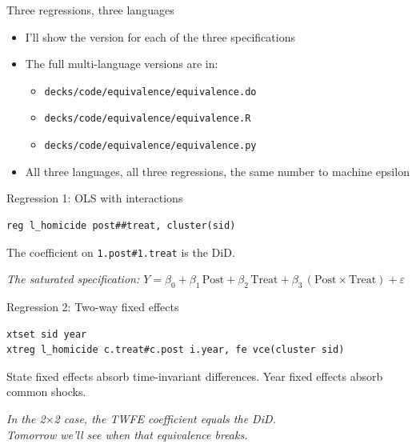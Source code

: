 \documentclass[aspectratio=169,11pt]{beamer}
\begin{document}
\begin{frame}{Three regressions, three languages}
\vspace{0.8em}
\begin{itemize}
  \item I'll show the  version for each of the three specifications
  \item The full multi-language versions are in:
  \begin{itemize}
    \item \texttt{decks/code/equivalence/equivalence.do}
    \item \texttt{decks/code/equivalence/equivalence.R}
    \item \texttt{decks/code/equivalence/equivalence.py}
  \end{itemize}
  \item All three languages, all three regressions, the same number to machine epsilon
\end{itemize}
\end{frame}

\begin{frame}[fragile]{Regression 1: OLS with interactions}
\vspace{0.5em}
\begin{lstlisting}[language={[ANSI]C}]
reg l_homicide post##treat, cluster(sid)
\end{lstlisting}
\vspace{1em}
The coefficient on \texttt{1.post\#1.treat} is the DiD.
\vspace{0.5em}
\begin{center}
\small\color{warmgray}\itshape The saturated specification: \quad $Y = \beta_0 + \beta_1\,\text{Post} + \beta_2\,\text{Treat} + \beta_3\,(\text{Post} \times \text{Treat}) + \varepsilon$
\end{center}
\end{frame}

\begin{frame}[fragile]{Regression 2: Two-way fixed effects}
\vspace{0.5em}
\begin{lstlisting}[language={[ANSI]C}]
xtset sid year
xtreg l_homicide c.treat#c.post i.year, fe vce(cluster sid)
\end{lstlisting}
\vspace{1em}
State fixed effects absorb time-invariant differences. Year fixed effects absorb common shocks.
\vspace{0.5em}
\begin{center}
\small\color{warmgray}\itshape In the 2$\times$2 case, the TWFE coefficient equals the DiD.\\Tomorrow we'll see when that equivalence breaks.
\end{center}
\end{frame}
\end{document}
